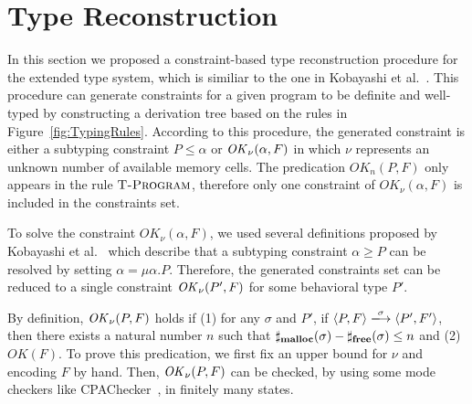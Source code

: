 \section{Type Reconstruction}\label{sec:reconstruction}
In this section we proposed a constraint-based type reconstruction
procedure for the extended type system, which is similiar to the one
in Kobayashi et al.~\cite{DBLP:journals/lmcs/KobayashiSW06}.  This
procedure can generate constraints for a given program to be definite
and well-typed by constructing a derivation tree based on the rules in
Figure~\ref{fig:TypingRules}. According to this procedure, the
generated constraint is either a subtyping constraint \(P \le \alpha
\) or \(\mathit{OK}_\nu(\alpha, F)\) in which \(\nu\) represents an unknown
number of available memory cells. The predication \(OK_n(P, F)\) only
appears in the rule \(\textsc{{T-Program}}\), therefore only one constraint of
\(OK_\nu(\alpha, F)\) is included in the constraints set.

To solve the constraint \(OK_\nu(\alpha, F)\), we used several
definitions proposed by Kobayashi et al.~\cite[Lemma
  3.8]{DBLP:journals/lmcs/KobayashiSW06} which describe that a
subtyping constraint \(\alpha \ge P\) can be resolved by setting
\(\alpha = \mu \alpha. P\).  Therefore, the generated constraints set
can be reduced to a single constraint \(\mathit{OK}_{\nu}(P', F)\) for some
behavioral type \(P'\).

By definition, \(\mathit{OK}_{\nu}(P, F)\) holds if (1) for any \(\sigma\) and
\(P'\), if \(\langle P, F \rangle \xlongrightarrow{\sigma} \langle P',
F'\rangle \), then there exists a natural number \(n\) such that
\(\sharp_{\mathbf{malloc}}(\sigma) - \sharp_{\mathbf{free}}(\sigma) \le n\) and (2)
\(OK(F)\). To prove this predication, we first fix an upper bound for
\(\nu\) and encoding \(F\) by hand.  Then, \(\mathit{OK}_{\nu}(P, F)\) can be
checked, by using some mode checkers like
CPAChecker~\cite{beyer2011cpachecker}, in finitely many states.

